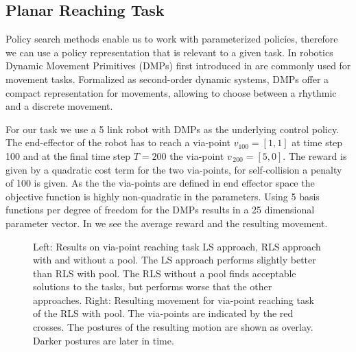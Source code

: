 \subsection{Planar Reaching Task}
Policy search methods enable us to work with parameterized policies,
therefore we can use a policy representation that is relevant
to a given task.
In robotics Dynamic Movement Primitives 
(DMPs) first introduced in \citet{ijspeert2002learning} are commonly used for movement tasks.
Formalized as second-order dynamic systems, DMPs offer a compact
representation for movements, allowing to choose between a rhythmic
and a discrete movement. 

For our task we use a 5 link robot with DMPs as the underlying
control policy. The end-effector of the robot has
to reach a via-point $v_{100} = [1,1]$ at time step 100
and at the final time step $T = 200$ the via-point $v_{\, 200} = [5,0]$.
The reward is given by a quadratic cost term for
the two via-points, for self-collision a penalty of 100 is given.
As the the via-points are defined in end effector space the objective
function is highly non-quadratic in the parameters. Using
5 basis functions per degree of freedom for the DMPs results
in a 25 dimensional parameter vector.
In  we see the average reward and the resulting
movement.

\begin{figure}
    \centering
    \begin{minipage}{0.45\textwidth}
      \centering
      \hspace{1cm}                       
    \end{minipage}\hfill
    \begin{minipage}{0.45\textwidth}
      \centering
      
      \hspace{1cm}                       
    \end{minipage}
     \caption{\small
       {\color{gray!25!black!60} Left:}
       Results on via-point reaching task
       LS approach, RLS approach with and without a pool.
       The LS approach performs slightly better than RLS
       with pool. The RLS without a pool finds
       acceptable solutions to the tasks, but performs worse
       that the other approaches.
       {\color{gray!25!black!60} Right:} Resulting movement for
       via-point reaching task of the RLS with pool.
       The via-points are indicated by the red crosses. The
       postures of the resulting motion are shown as overlay.
       Darker postures are later in time.
     }
     \label{fig:reaching_result}      
\end{figure}

